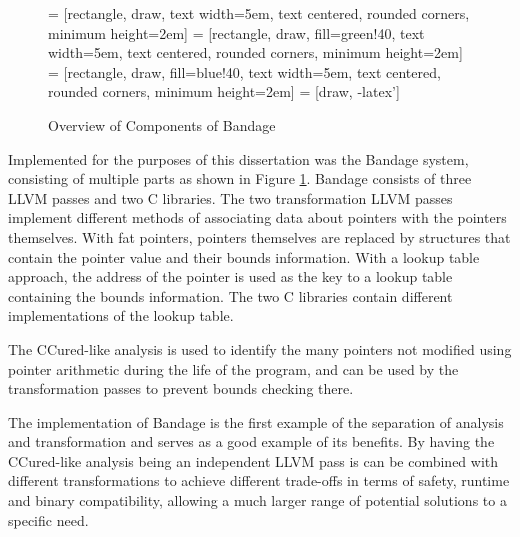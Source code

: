 \documentclass[a4paper,12pt,twoside,openright]{report}
\begin{document}
\begin{figure}
\centering
{} = [rectangle, draw, 
text width=5em, text centered, rounded corners, minimum height=2em]
 = [rectangle, draw, fill=green!40, 
text width=5em, text centered, rounded corners, minimum height=2em]
 = [rectangle, draw, fill=blue!40, 
text width=5em, text centered, rounded corners, minimum height=2em]
 = [draw, -latex']
\caption{Overview of Components of Bandage}
\label{fig:Components}
\end{figure}

Implemented for the purposes of this dissertation was the Bandage system, consisting of multiple parts as shown in Figure \ref{fig:Components}.
Bandage consists of three LLVM passes and two C libraries.
The two transformation LLVM passes implement different methods of associating data about pointers with the pointers themselves.
With fat pointers, pointers themselves are replaced by structures that contain the pointer value and their bounds information.
With a lookup table approach, the address of the pointer is used as the key to a lookup table containing the bounds information.
The two C libraries contain different implementations of the lookup table.

The CCured-like analysis is used to identify the many pointers not modified using pointer arithmetic during the life of the program, and can be used by the transformation passes to prevent bounds checking there.

The implementation of Bandage is the first example of the separation of analysis and transformation and serves as a good example of its benefits.
By having the CCured-like analysis being an independent LLVM pass is can be combined with different transformations to achieve different trade-offs in terms of safety, runtime and binary compatibility, allowing a much larger range of potential solutions to a specific need.
\end{document}
